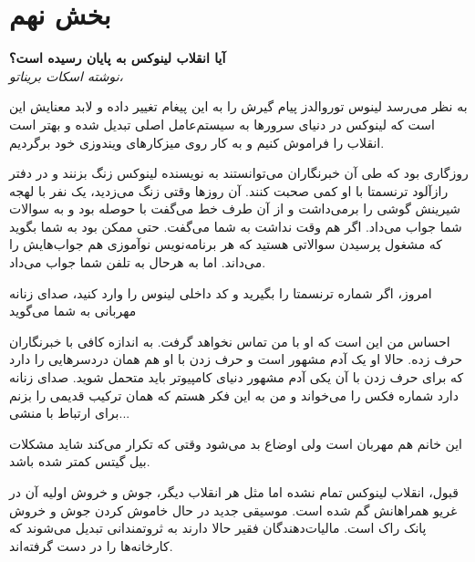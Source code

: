 \section{بخش نهم}

\textbf{\large آیا انقلاب لینوکس به پایان رسیده است؟} \\
\emph{\large نوشته اسکات بریناتو، }

\vspace*{10pt}
\textbf{\Large {}}

\begin{journalinside}
به نظر می‌رسد لینوس توروالدز پیام گیرش را به این پیغام تغییر داده و لابد معنایش این است که لینوکس در دنیای سرورها به سیستم‌عامل اصلی تبدیل شده  و بهتر است انقلاب را فراموش کنیم و به کار روی میزکارهای ویندوزی خود برگردیم. 

روزگاری بود که طی آن خبرنگاران می‌توانستند به نویسنده لینوکس زنگ بزنند
و در دفتر رازآلود ترنسمتا با او کمی صحبت کنند. آن روزها وقتی زنگ
می‌زدید، یک نفر با لهجه شیرینش گوشی را برمی‌داشت و از آن طرف خط می‌گفت
 با حوصله بود و به سوالات شما جواب می‌داد. اگر هم وقت
نداشت به شما می‌گفت. حتی ممکن بود به شما بگوید که مشغول پرسیدن سوالاتی
هستید که هر برنامه‌نویس نوآموزی هم جواب‌هایش را می‌داند. اما به هرحال به
تلفن شما جواب می‌داد.

امروز، اگر شماره ترنسمتا را بگیرید و کد داخلی لینوس را وارد کنید، صدای
زنانه مهربانی به شما می‌گوید 

احساس من این است که او با من تماس نخواهد گرفت. به اندازه کافی با
خبرنگاران حرف زده. حالا او یک آدم مشهور است و حرف زدن با او هم همان
دردسرهایی را دارد که برای حرف زدن با آن یکی آدم مشهور دنیای کامپیوتر
باید متحمل شوید. صدای زنانه دارد شماره فکس را می‌خواند و من به این فکر
هستم که همان ترکیب قدیمی  را بزنم برای ارتباط با منشی...

 این خانم هم مهربان
است ولی اوضاع بد می‌شود وقتی که تکرار می‌کند  شاید مشکلات بیل گیتس کمتر
شده باشد.

قبول، انقلاب لینوکس تمام نشده اما مثل هر انقلاب دیگر، جوش و خروش اولیه
آن در غریو همراهانش گم شده است. موسیقی جدید در حال خاموش کردن جوش و
خروش پانک راک است. مالیات‌دهندگان فقیر حالا دارند به ثروتمندانی تبدیل
می‌شوند که کارخانه‌ها را در دست گرفته‌اند.


\end{journalinside}
